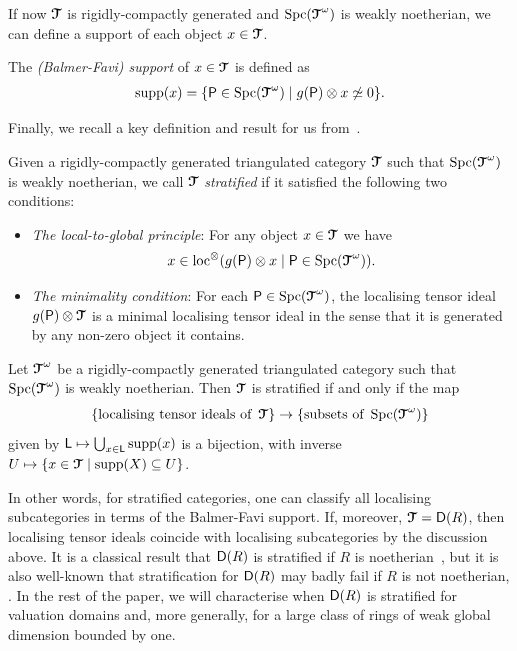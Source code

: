 \documentclass[reqno,a4paper]{amsart}
\begin{document}
If now $\operatorname{\boldsymbol{\mathcal{T}}}$ is rigidly-compactly generated and $\operatorname{Spc}(\operatorname{\boldsymbol{\mathcal{T}}}^\omega)$ is weakly noetherian, we can define a support of each object $x\in\operatorname{\boldsymbol{\mathcal{T}}}$.

\begin{definition} \label{def:support}
The \emph{(Balmer-Favi) support} of $x\in\operatorname{\boldsymbol{\mathcal{T}}}$ is defined as
\[
\operatorname{supp}(x) = \{\mathsf{P}\in\operatorname{Spc}(\operatorname{\boldsymbol{\mathcal{T}}}^\omega) \mid g(\mathsf{P})\otimes x\not\simeq 0 \}.
\]
\end{definition}

Finally, we recall a key definition and result for us from~\cite{bhs23}.

\begin{definition}\label{def:stratified}
Given a rigidly-compactly generated triangulated category $\operatorname{\boldsymbol{\mathcal{T}}}$ such that $\operatorname{Spc}(\operatorname{\boldsymbol{\mathcal{T}}}^\omega)$ is weakly noetherian, we call $\operatorname{\boldsymbol{\mathcal{T}}}$ \emph{stratified} if it satisfied the following two conditions:

\begin{itemize}
\item \emph{The local-to-global principle}:
For any object $x\in \operatorname{\boldsymbol{\mathcal{T}}}$ we have 
\[
x \in \operatorname{loc}^\otimes( g(\mathsf{P})\otimes x \mid \mathsf{P}\in\operatorname{Spc}(\operatorname{\boldsymbol{\mathcal{T}}}^\omega) ).
\]
\item \emph{The minimality condition}:
For each $\mathsf{P} \in \operatorname{Spc}(\operatorname{\boldsymbol{\mathcal{T}}}^\omega)$, the localising tensor ideal
$g(\mathsf{P})\otimes\operatorname{\boldsymbol{\mathcal{T}}}$ is a minimal localising tensor ideal in the sense that it
is generated by any non-zero object it contains.
\end{itemize}
\end{definition}

\begin{theorem} \label{thm:stratification-abstract}
Let $\operatorname{\boldsymbol{\mathcal{T}}}^\omega$ be a rigidly-compactly generated triangulated category such that $\operatorname{Spc}(\operatorname{\boldsymbol{\mathcal{T}}}^\omega)$ is weakly noetherian. Then $\operatorname{\boldsymbol{\mathcal{T}}}$ is stratified if and only if the map
\[
\{ \text{localising tensor ideals of } \operatorname{\boldsymbol{\mathcal{T}}} \} \to
\{ \text{subsets of } \operatorname{Spc}(\operatorname{\boldsymbol{\mathcal{T}}}^\omega) \}
\]
given by $\mathsf{L} \mapsto \bigcup_{x\in\mathsf{L}}\operatorname{supp}(x)$ is a bijection, with inverse $U\mapsto\{x\in\operatorname{\boldsymbol{\mathcal{T}}}\mid\operatorname{supp}(X)\subseteq U\}$.
\end{theorem}

In other words, for stratified categories, one can classify all localising subcategories in terms of the Balmer-Favi support.
If, moreover, $\operatorname{\boldsymbol{\mathcal{T}}}=\mathsf{D}(R)$, then localising tensor ideals coincide with localising subcategories by the discussion above.
It is a classical result that $\mathsf{D}(R)$ is stratified if $R$ is noetherian~\cite[Theorem~2.8]{neemanchromtower}, but it is also well-known that stratification for $\mathsf{D}(R)$ may badly fail if $R$ is not noetherian, \cite{neemanOddball}.
In the rest of the paper, we will characterise when $\mathsf{D}(R)$ is stratified for valuation domains and, more generally, for a large class of rings of weak global dimension bounded by one.
\end{document}
